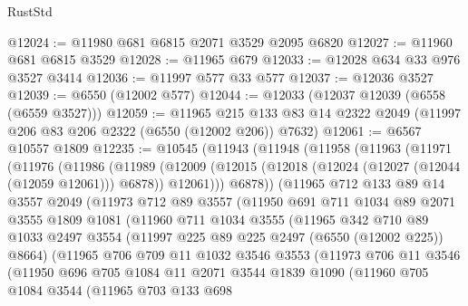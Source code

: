 \begin{lexlean}{RustStd}
\begin{coremodule}
@12024 := @11980 @681 @6815 @2071 @3529 @2095 @6820
@12027 := @11960 @681 @6815 @3529
@12028 := @11965 @679
@12033 := @12028 @634 @33 @976 @3527 @3414
@12036 := @11997 @577 @33 @577
@12037 := @12036 @3527
@12039 := @6550 (@12002 @577)
@12044 := @12033 (@12037 @12039 (@6558 (@6559 @3527)))
@12059 := @11965
    @215
    @133
    @83
    @14
    @2322
    @2049
    (@11997 @206 @83 @206 @2322 (@6550 (@12002 @206)) @7632)
@12061 := @6567 @10557 @1809
@12235 := @10545
    (@11943
      (@11948
        (@11958
          (@11963
            (@11971
              (@11976
                (@11986
                  (@11989
                    (@12009
                      (@12015 (@12018 (@12024 (@12027 (@12044 (@12059 @12061))) @6878)) @12061)))
                  @6878))
              (@11965
                @712
                @133
                @89
                @14
                @3557
                @2049
                (@11973
                  @712
                  @89
                  @3557
                  (@11950
                    @691
                    @711
                    @1034
                    @89
                    @2071
                    @3555
                    @1809
                    @1081
                    (@11960
                      @711
                      @1034
                      @3555
                      (@11965
                        @342
                        @710
                        @89
                        @1033
                        @2497
                        @3554
                        (@11997 @225 @89 @225 @2497 (@6550 (@12002 @225)) @8664)
                        (@11965
                          @706
                          @709
                          @11
                          @1032
                          @3546
                          @3553
                          (@11973
                            @706
                            @11
                            @3546
                            (@11950
                              @696
                              @705
                              @1084
                              @11
                              @2071
                              @3544
                              @1839
                              @1090
                              (@11960
                                @705
                                @1084
                                @3544
                                (@11965
                                  @703
                                  @133
                                  @698

\end{coremodule}
\end{lexlean}
